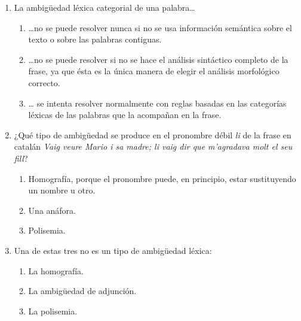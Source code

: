 \begin{enumerate}
\item La ambigüedad léxica categorial de una palabra{\ldots} \begin{enumerate} \item {\ldots}no se puede resolver nunca si no se usa información semántica sobre el texto o sobre las palabras contiguas. \item {\ldots}no se puede resolver si no se hace el análisis sintáctico completo de la frase, ya que ésta es la única manera de elegir el análisis morfológico correcto. \item {\ldots} se intenta resolver normalmente con reglas basadas en las categorías léxicas de las palabras que la acompañan en la frase. \end{enumerate} 

\item ¿Qué tipo de ambigüedad se produce en el pronombre débil \emph{li} de la frase  en catalán \emph{Vaig veure Mario i sa madre; li vaig dir que m'agradava molt el seu fill}? \begin{enumerate} \item Homografía, porque el pronombre puede, en principio, estar sustituyendo un nombre u otro. \item Una anáfora. \item Polisemia. \end{enumerate} 

\item Una de estas tres no es un tipo de ambigüedad léxica: \begin{enumerate} \item La homografía. \item La ambigüedad de adjunción. \item La polisemia. \end{enumerate} 


\end{enumerate}
